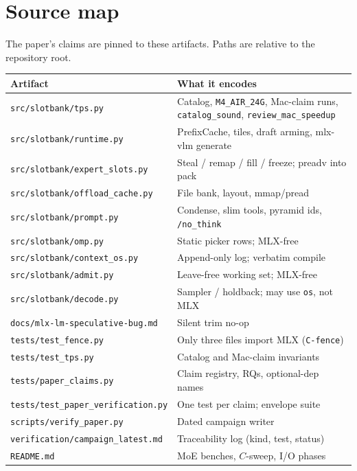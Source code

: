 \section{Source map}
\label{app:source}

The paper's claims are pinned to these artifacts. Paths are relative to the repository root.

\begin{center}
\small
\begin{tabular}{@{}p{4.4cm}p{8.8cm}@{}}
\toprule
Artifact & What it encodes \\
\midrule
\texttt{src/slotbank/tps.py} & Catalog, \texttt{M4\_AIR\_24G}, Mac-claim runs, \texttt{catalog\_sound}, \texttt{review\_mac\_speedup} \\
\texttt{src/slotbank/runtime.py} & PrefixCache, tiles, draft arming, mlx-vlm generate \\
\texttt{src/slotbank/expert\_slots.py} & Steal / remap / fill / freeze; preadv into pack \\
\texttt{src/slotbank/offload\_cache.py} & File bank, layout, mmap/pread \\
\texttt{src/slotbank/prompt.py} & Condense, slim tools, pyramid ids, \texttt{/no\_think} \\
\texttt{src/slotbank/omp.py} & Static picker rows; MLX-free \\
\texttt{src/slotbank/context\_os.py} & Append-only log; verbatim compile \\
\texttt{src/slotbank/admit.py} & Leave-free working set; MLX-free \\
\texttt{src/slotbank/decode.py} & Sampler / holdback; may use \texttt{os}, not MLX \\
\texttt{docs/mlx-lm-speculative-bug.md} & Silent trim no-op \\
\texttt{tests/test\_fence.py} & Only three files import MLX (\texttt{C-fence}) \\
\texttt{tests/test\_tps.py} & Catalog and Mac-claim invariants \\
\texttt{tests/paper\_claims.py} & Claim registry, RQs, optional-dep names \\
\texttt{tests/test\_paper\_verification.py} & One test per claim; envelope suite \\
\texttt{scripts/verify\_paper.py} & Dated campaign writer \\
\texttt{verification/campaign\_latest.md} & Traceability log (kind, test, status) \\
\texttt{README.md} & MoE benches, $C$-sweep, I/O phases \\
\bottomrule
\end{tabular}
\end{center}

